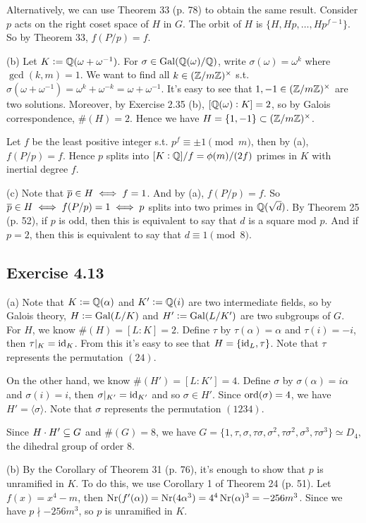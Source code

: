 \documentclass[../Marcus.tex]{subfiles}
\begin{document}
Alternatively, we can use Theorem 33 (p. 78) to obtain the same result. Consider $p$ acts on the right coset space of $H$ in $G$. The orbit of $H$ is $\{H,Hp,\ldots,Hp^{f-1}\}$. So by Theorem 33, $f(P/p)=f$.

(b) Let $K:=\mathbb{Q}(\omega+\omega^{-1})$. For $\sigma\in\operatorname{Gal}(\mathbb{Q}(\omega)/\mathbb{Q})$, write $\sigma(\omega)=\omega^k$ where $\gcd(k,m)=1$. We want to find all $k\in(\mathbb{Z}/m\mathbb{Z})^\times$ s.t. $\sigma(\omega+\omega^{-1})=\omega^k+\omega^{-k}=\omega+\omega^{-1}$. It's easy to see that $1,-1\in(\mathbb{Z}/m\mathbb{Z})^\times$ are two solutions. Moreover, by Exercise 2.35 (b), $[\mathbb{Q}(\omega):K]=2$, so by Galois correspondence, $\#(H)=2$. Hence we have $H=\{1,-1\}\subset(\mathbb{Z}/m\mathbb{Z})^\times$.

Let $f$ be the least positive integer s.t. $p^f \equiv \pm1\pmod{m}$, then by (a), $f(P/p)=f$. Hence $p$ splits into $[K:\mathbb{Q}] / f = \phi(m)/(2f)$ primes in $K$ with inertial degree $f$.

(c) Note that $\overline{p}\in H \iff f = 1$. And by (a), $f(P/p)=f$. So $\overline{p}\in H \iff f(P/p) = 1 \iff p$ splits into two primes in $\mathbb{Q}(\sqrt{d})$. By Theorem 25 (p. 52), if $p$ is odd, then this is equivalent to say that $d$ is a square mod $p$. And if $p=2$, then this is equivalent to say that $d\equiv 1\pmod{8}$.

\subsection*{Exercise 4.13}

(a) Note that $K:=\mathbb{Q}(\alpha)$ and $K':=\mathbb{Q}(i)$ are two intermediate fields, so by Galois theory, $H:=\operatorname{Gal}(L/K)$ and $H':=\operatorname{Gal}(L/K')$ are two subgroups of $G$.
For $H$, we know $\#(H)=[L:K]=2$. Define $\tau$ by $\tau(\alpha)=\alpha$ and $\tau(i)=-i$, then $\tau|_K=\operatorname{id}_K$. From this it's easy to see that $H=\{\operatorname{id}_L,\tau\}$. Note that $\tau$ represents the permutation $(24)$.

On the other hand, we know $\#(H')=[L:K']=4$. Define $\sigma$ by $\sigma(\alpha)=i\alpha$ and $\sigma(i)=i$, then $\sigma|_{K'}=\operatorname{id}_{K'}$ and so $\sigma\in H'$. Since $\operatorname{ord}(\sigma)=4$, we have $H'=\langle\sigma\rangle$. Note that $\sigma$ represents the permutation $(1234)$.

Since $H\cdot H'\subseteq G$ and $\#(G)=8$, we have $G=\{1,\tau,\sigma,\tau\sigma,\sigma^2,\tau\sigma^2,\sigma^3,\tau\sigma^3\}\simeq D_4$, the dihedral group of order $8$.

(b) By the Corollary of Theorem 31 (p. 76), it's enough to show that $p$ is unramified in $K$. To do this, we use Corollary 1 of Theorem 24 (p. 51). Let $f(x)=x^4-m$, then $\operatorname{Nr}(f'(\alpha))=\operatorname{Nr}(4\alpha^3)=4^4\operatorname{Nr}(\alpha)^3=-256m^3$. Since we have $p\nmid -256m^3$, so $p$ is unramified in $K$. 
\end{document}

